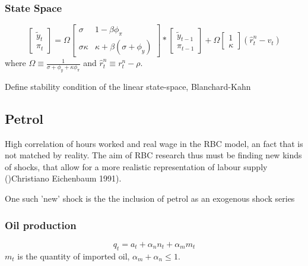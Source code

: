 \documentclass[12pt,a4paper,english]{article} %
\begin{document}
	\subsubsection{State Space}
	\begin{equation}
		\begin{bmatrix}
			\tilde{y}_t \\
			\pi_t
		\end{bmatrix}
		=
		\Omega
		\begin{bmatrix}
			\sigma & 1 - \beta \phi_{\pi} \\
			\sigma \kappa & \kappa + \beta (\sigma + \phi_y)
		\end{bmatrix}
		*
		\begin{bmatrix}
			\tilde{y}_{t-1} \\
			\pi_{t-1}
		\end{bmatrix}
		+
		\Omega
		\begin{bmatrix}
			1 \\
			\kappa
		\end{bmatrix}	
		(\hat{r}_t^n - v_t)
	\end{equation}
	where $\Omega \equiv \frac{1}{\sigma + \phi_y + \kappa \phi_{\pi}}$ and $\hat{r}_t^n \equiv r_t^n - \rho$.
	
	Define stability condition of the linear state-space, Blanchard-Kahn

	\subsection{Petrol}
	High correlation of hours worked and real wage in the RBC model, an fact that is not matched by reality. The aim of RBC research thus must be finding new kinds of shocks, that allow for a more realistic representation of labour supply ()Christiano Eichenbaum 1991).
	
	
	One such 'new' shock is the the inclusion of petrol as an exogenous shock series \cite{kim_role_1992}
	
	
	\subsubsection{Oil production}
	\begin{equation}
		q_t = a_t + \alpha_n n_t + \alpha_m m_t
	\end{equation}
	$m_t$ is the quantity of imported oil, $\alpha_m + \alpha_n \leq 1$.\\
	\\
\end{document}
